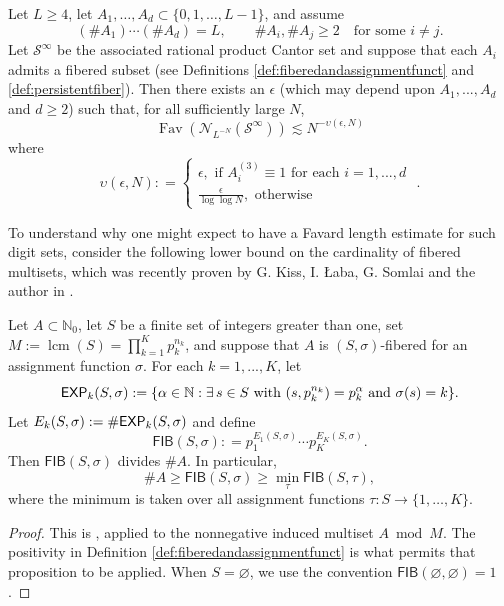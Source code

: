 \documentclass[12pt]{amsart}
\numberwithin{equation}{section}
\DeclareMathOperator{\Fav}{Fav}
\DeclareMathOperator{\lcm}{lcm}
\newcommand{\capexp}{\hbox{\sf EXP}}
\begin{document}
\begin{theorem}\label{thm:fibered}
    Let $L\geq4$, let $A_1,\ldots,A_d\subset\{0,1,\ldots,L-1\}$, and assume
    \[
    (\#A_1)\cdots(\#A_d)=L,
    \qquad
    \#A_i,\#A_j\geq2\quad\text{for some }i\neq j.
    \]
    Let $\mathcal S^\infty$ be the associated rational product Cantor set and suppose that each $A_i$ admits a fibered subset (see Definitions \ref{def:fiberedandassignmentfunct} and \ref{def:persistentfiber}).
    Then there exists an $\epsilon$ (which may depend upon $A_1,...,A_d$ and $d \geq 2$) such that, for all sufficiently large $N$,
    $$
    \Fav (\mathcal{N}_{L^{-N}} (\mathcal{S}^{\infty})) \lesssim N^{-\upsilon(\epsilon,N)}
    $$
    where
    $$
    \upsilon (\epsilon,N) : =
\begin{cases}
    \epsilon, \textrm{ if } A_i^{(3)} \equiv 1 \textrm{ for each } i = 1,...,d \\[1ex]
    \frac{\epsilon}{\log \log N}, \textrm{ otherwise }
\end{cases}
    \, \, .$$
\end{theorem}

To understand why one might expect to have a Favard length estimate for such digit sets, consider the following lower bound on the cardinality of fibered multisets, which was recently proven by G. Kiss, I. {\L}aba, G. Somlai and the author in \cite{KLMS}.

\begin{proposition}\label{prop:multifibered}
Let $A \subset \mathbb{N}_{0}$, let $S$ be a finite set of integers greater
than one, set $M:=\lcm(S)=\prod_{k=1}^Kp_k^{n_k}$, and suppose that $A$ is
$(S,\sigma)$-fibered for an assignment function $\sigma$.  For each
$k = 1,...,K$, let
$$
\capexp_k(S, \sigma) : = \{ \alpha\in \mathbb{N} : \exists \, s \in S \textrm{ with } (s, p_k^{n_k}) = p_k^{\alpha} \textrm{ and } \sigma (s) = k \}.
$$
Let $E_k(S,\sigma) : = \# \capexp_k(S, \sigma )$ and define
$$
\mathsf{FIB}(S,\sigma) : = p_1^{E_1(S,\sigma)} \cdots p_K^{E_K(S,\sigma)}.
$$
Then $\mathsf{FIB}(S,\sigma)$ divides $\#A$.  In particular,
\begin{equation}\label{eq:fiberedlower bound}
\# A \geq \mathsf{FIB}(S,\sigma)
\geq \min_{\tau}\mathsf{FIB}(S,\tau),
\end{equation}
where the minimum is taken over all assignment functions $\tau:S\rightarrow\{1,\ldots,K\}$.
\end{proposition}

\begin{proof}
This is \cite[Proposition 3.2]{KLMS}, applied to the nonnegative induced
multiset $A\bmod M$.  The positivity in Definition
\ref{def:fiberedandassignmentfunct} is what permits that proposition to be
applied.  When $S=\varnothing$, we use the convention
$\mathsf{FIB}(\varnothing,\varnothing)=1$.
\end{proof}
\end{document}
